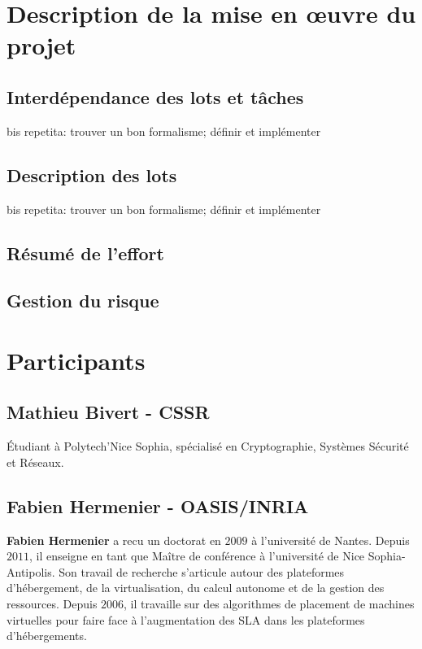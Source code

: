 \documentclass[a4paper]{article}
\begin{document}
\section{Description de la mise en œuvre du projet}
\subsection{Interdépendance des lots et tâches}
bis repetita: trouver un bon formalisme; définir et implémenter
\subsection{Description des lots}
bis repetita: trouver un bon formalisme; définir et implémenter
\subsection{Résumé de l'effort}
\subsection{Gestion du risque}

\section{Participants}
\subsection{Mathieu Bivert - CSSR}
Étudiant à Polytech'Nice Sophia, spécialisé en Cryptographie, Systèmes
Sécurité et Réseaux.

\subsection{Fabien Hermenier - OASIS/INRIA}
\textbf{Fabien Hermenier} a recu un doctorat en $2009$ à l'université
de Nantes. Depuis $2011$, il enseigne en tant que Maître de conférence
à l'université de Nice Sophia-Antipolis. Son travail de recherche
s'articule autour des plateformes d'hébergement, de la virtualisation,
du calcul autonome et de la gestion des ressources. Depuis $2006$, il
travaille sur des algorithmes de placement de machines virtuelles pour
faire face à l'augmentation des SLA dans les plateformes d'hébergements.

\newpage
{}


\end{document}
